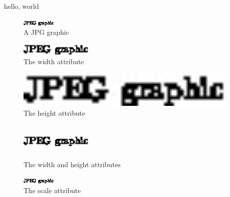 \documentclass{amsart}
\begin{document}
hello, world

\begin{figure}[h]
\includegraphics{sample-jpeg}
\caption{A JPG graphic}
\end{figure}

\begin{figure}[h]
\includegraphics[width=100pt]{sample-jpeg}
\caption{The width attribute}
\end{figure}

\begin{figure}[h]
\includegraphics[height=50pt]{sample-jpeg}
\caption{The height attribute}
\end{figure}

\begin{figure}[h]
\includegraphics[width=100pt,height=50pt]{sample-jpeg}
\caption{The width and height attributes}
\end{figure}

\begin{figure}[h]
\includegraphics[scale=2]{sample-jpeg}
\caption{The scale attribute}
\end{figure}
\end{document}

